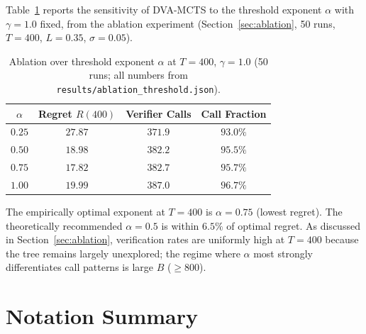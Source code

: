 Table~\ref{tab:hyperparams} reports the sensitivity of DVA-MCTS to the threshold
exponent $\alpha$ with $\gamma = 1.0$ fixed, from the ablation experiment
(Section~\ref{sec:ablation}, 50 runs, $T = 400$, $L = 0.35$, $\sigma = 0.05$).

\begin{table}[h]
\centering
\caption{Ablation over threshold exponent $\alpha$ at $T{=}400$, $\gamma{=}1.0$
         (50 runs; all numbers from \texttt{results/ablation\_threshold.json}).}
\label{tab:hyperparams}
\begin{tabular}{cccc}
\toprule
$\alpha$ & Regret $R(400)$ & Verifier Calls & Call Fraction \\
\midrule
$0.25$ & $27.87$ & $371.9$ & $93.0\%$ \\
$0.50$ & $18.98$ & $382.2$ & $95.5\%$ \\
$0.75$ & $\mathbf{17.82}$ & $382.7$ & $95.7\%$ \\
$1.00$ & $19.99$ & $387.0$ & $96.7\%$ \\
\bottomrule
\end{tabular}
\end{table}

The empirically optimal exponent at $T{=}400$ is $\alpha{=}0.75$ (lowest regret).
The theoretically recommended $\alpha{=}0.5$ is within $6.5\%$ of optimal regret.
As discussed in Section~\ref{sec:ablation}, verification rates are uniformly high
at $T{=}400$ because the tree remains largely unexplored; the regime where $\alpha$
most strongly differentiates call patterns is large $B$ (${\geq}800$).

\section{Notation Summary}
\label{app:notation}

